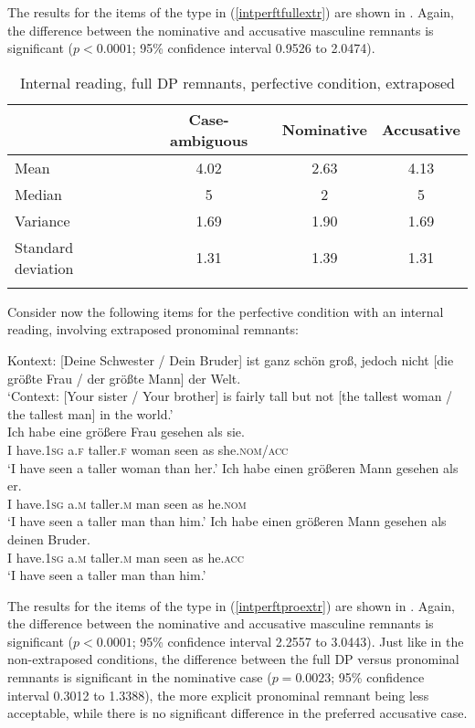 The results for the items of the type in (\ref{intperftfullextr}) are shown in .
Again, the difference between the nominative and accusative masculine remnants is significant ($p<0.0001$; 95\% confidence interval 0.9526 to 2.0474). 

\begin{table}
\begin{tabular}{l *3{S[table-format=1.2]}}
\lsptoprule
{} & {Case-ambiguous} & {Nominative} & {Accusative}\\
\midrule
Mean & 4.02 & 2.63 & 4.13\\
Median & 5 & 2 & 5\\
Variance & 1.69 & 1.90 & 1.69\\
Standard deviation & 1.31 & 1.39 & 1.31\\
\lspbottomrule
\end{tabular}
\caption{Internal reading, full DP remnants, perfective condition, extraposed}
\label{tableintperftfullextr}
\end{table} 


Consider now the following items for the perfective condition with an internal reading, involving extraposed pronominal remnants:

\ea Kontext: [Deine Schwester / Dein Bruder] ist ganz schön groß, jedoch nicht [die größte Frau / der größte Mann] der Welt. \label{intperftproextr}\\
`Context: [Your sister / Your brother] is fairly tall but not [the tallest woman / the tallest man] in the world.'\\
\ea \gll Ich habe eine größere Frau gesehen als sie. \label{intperftproextrambig}\\
I have.\textsc{1sg} a.\textsc{f} taller.\textsc{f} woman seen as she.\textsc{nom/acc}\\
\glt `I have seen a taller woman than her.'
\ex \gll Ich habe einen größeren Mann gesehen als er. \label{intperftproextrnom}\\
I have.\textsc{1sg} a.\textsc{m} taller.\textsc{m} man seen as he.\textsc{nom}\\
\glt `I have seen a taller man than him.'
\ex \gll Ich habe einen größeren Mann gesehen als deinen Bruder. \label{intperftproextracc}\\
I have.\textsc{1sg} a.\textsc{m} taller.\textsc{m} man seen as he.\textsc{acc}\\
\glt `I have seen a taller man than him.'
\z
\z

The results for the items of the type in (\ref{intperftproextr}) are shown in .
Again, the difference between the nominative and accusative masculine remnants is significant ($p<0.0001$; 95\% confidence interval 2.2557 to 3.0443). Just like in the non-extraposed conditions, the difference between the full DP versus pronominal remnants is significant in the nominative case ($p=0.0023$; 95\% confidence interval 0.3012 to 1.3388), the more explicit pronominal remnant being less acceptable, while there is no significant difference in the preferred accusative case.


